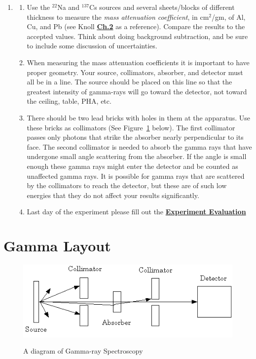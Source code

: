 \documentclass{../lab}
\begin{document}
\begin{enumerate}
    \item \begin{enumerate}
        \item Use the $^{22}$Na and $^{137}$Cs sources and several sheets/blocks of different thickness to measure the \emph{mass attenuation coefficient}, in cm$^2$/gm, of Al, Cu, and Pb (see Knoll \href{http://physics111.lib.berkeley.edu/Physics111/Reprints/GMA/01-Radiation\_Detection\_and\_Measurement\_CH\_02.pdf}{\textbf{Ch.2}} as a reference). Compare the results to the accepted values. Think about doing background subtraction, and be sure to include some discussion of uncertainties.

        \item When measuring the mass attenuation coefficients it is important to have proper geometry. Your source, collimators, absorber, and detector must all be in a line. The source should be placed on this line so that the greatest intensity of gamma-rays will go toward the detector, not toward the ceiling, table, PHA, etc.

        \item There should be two lead bricks with holes in them at the apparatus. Use these bricks as collimators (See Figure~\ref{fig:GMAimage008} below). The first collimator passes only photons that strike the absorber nearly perpendicular to its face. The second collimator is needed to absorb the gamma rays that have undergone small angle scattering from the absorber. If the angle is small enough these gamma rays might enter the detector and be counted as unaffected gamma rays. It is possible for gamma rays that are scattered by the collimators to reach the detector, but these are of such low energies that they do not affect your results significantly.

        \item Last day of the experiment please fill out the \href{\ExperimentEvaluation}{\textbf{Experiment Evaluation}}

    \end{enumerate}

\end{enumerate}

\section{Gamma Layout}

\begin{figure}[h]
    \centering
    \href{http://experimentationlab.berkeley.edu/sites/default/files/images/GMAimage008.gif}{\includegraphics[width=0.7\linewidth]{images/GMAimage008.png}}
    \caption{A diagram of Gamma-ray Spectroscopy}
    \label{fig:GMAimage008}
\end{figure}
\end{document}
